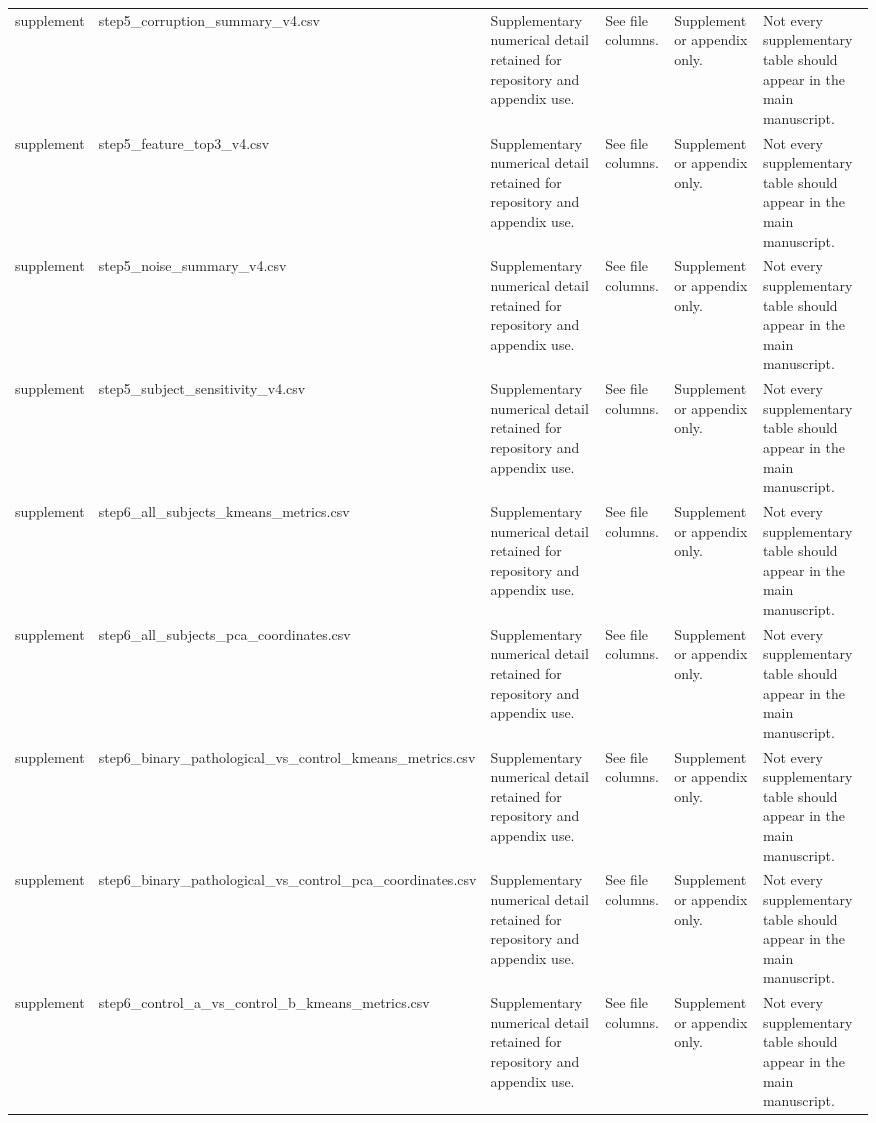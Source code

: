 \begin{longtable}{llllll}
supplement & step5_corruption_summary_v4.csv & Supplementary numerical detail retained for repository and appendix use. & See file columns. & Supplement or appendix only. & Not every supplementary table should appear in the main manuscript. \\
supplement & step5_feature_top3_v4.csv & Supplementary numerical detail retained for repository and appendix use. & See file columns. & Supplement or appendix only. & Not every supplementary table should appear in the main manuscript. \\
supplement & step5_noise_summary_v4.csv & Supplementary numerical detail retained for repository and appendix use. & See file columns. & Supplement or appendix only. & Not every supplementary table should appear in the main manuscript. \\
supplement & step5_subject_sensitivity_v4.csv & Supplementary numerical detail retained for repository and appendix use. & See file columns. & Supplement or appendix only. & Not every supplementary table should appear in the main manuscript. \\
supplement & step6_all_subjects_kmeans_metrics.csv & Supplementary numerical detail retained for repository and appendix use. & See file columns. & Supplement or appendix only. & Not every supplementary table should appear in the main manuscript. \\
supplement & step6_all_subjects_pca_coordinates.csv & Supplementary numerical detail retained for repository and appendix use. & See file columns. & Supplement or appendix only. & Not every supplementary table should appear in the main manuscript. \\
supplement & step6_binary_pathological_vs_control_kmeans_metrics.csv & Supplementary numerical detail retained for repository and appendix use. & See file columns. & Supplement or appendix only. & Not every supplementary table should appear in the main manuscript. \\
supplement & step6_binary_pathological_vs_control_pca_coordinates.csv & Supplementary numerical detail retained for repository and appendix use. & See file columns. & Supplement or appendix only. & Not every supplementary table should appear in the main manuscript. \\
supplement & step6_control_a_vs_control_b_kmeans_metrics.csv & Supplementary numerical detail retained for repository and appendix use. & See file columns. & Supplement or appendix only. & Not every supplementary table should appear in the main manuscript. \\

\end{longtable}
